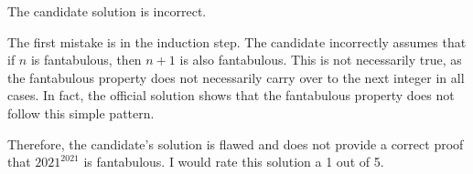 The candidate solution is incorrect.

The first mistake is in the induction step. The candidate incorrectly assumes that if $n$ is fantabulous, then $n+1$ is also fantabulous. This is not necessarily true, as the fantabulous property does not necessarily carry over to the next integer in all cases. In fact, the official solution shows that the fantabulous property does not follow this simple pattern.

Therefore, the candidate's solution is flawed and does not provide a correct proof that $2021^{2021}$ is fantabulous. I would rate this solution a 1 out of 5.
